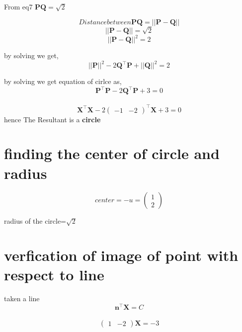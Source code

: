 \documentclass[journal,12pt,twocolumn]{article}
\newcommand{\myvec}[1]{\ensuremath{\begin{pmatrix}#1\end{pmatrix}}}
\let\vec\mathbf
\begin{document}
From eq7 $\vec{PQ}=\sqrt{2}$

 \begin{equation}
 Distance between \vec{PQ}=||\vec{P}-\vec{Q}||
\end{equation} 
\begin{equation}
  ||\vec{P}-\vec{Q}||=\sqrt{2}
\end{equation} 
\begin{equation}
  ||\vec{P-Q}||^2=2
\end{equation} 

 by solving we get,
\begin{equation}
  {||\vec{P}||^2-2\vec{Q}^{\top}\vec{P}+||\vec{Q}||^2 
}=2
\end{equation} 

by solving we get equation of cirlce as,\\
 \begin{equation}
{{\vec{P^{\top}P} - 2\vec{Q^{\top}\vec{P}}+3}}=0 
 \end{equation}\\
 \begin{equation}
 {{\vec{X^{\top}X} - 2\myvec{-1 & -2}^{\top}\vec{X}}+3}=0
 \end{equation}
hence The Resultant is a \textbf{circle} \\

\section{finding the center of circle and radius}
 
 \begin{equation}
  center=-u=\myvec{1 \\ 2}
\end{equation} 

\begin{center}
radius of the circle=$\sqrt{2}$
\end{center}
\section{verfication of image of point with respect to line }
taken a line
\begin{equation}
 \vec{n}^{\top}\vec{X}=C
 \end{equation}\\
\begin{equation}
\myvec{1 & -2}\vec{X}=-3\label{eq-2}
\end{equation}
\end{document}

